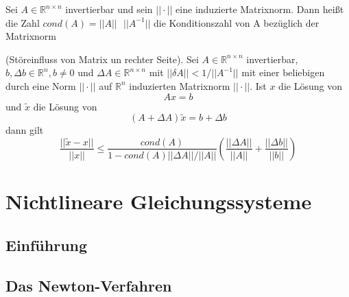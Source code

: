 \documentclass[
	ngerman,
	accentcolor=9c,%
	type=intern,
	marginpar=false
	]{tudapub}
\begin{document}
            \begin{definition}
                Sei $A \in \mathbb{R}^{n\times n}$ invertierbar und sein $|| \cdot||$ eine induzierte Matrixnorm. Dann heißt die Zahl $cond(A) = ||A||\mbox{ }||A^{-1}||$ die Konditionszahl von A bezüglich der Matrixnorm
            \end{definition}
            \begin{satz}
                (Störeinfluss von Matrix un rechter Seite). Sei $A \in \mathbb{R}^{n \times n}$ invertierbar, $b,\Delta b \in \mathbb{R}^n, b \not = 0$ und $\Delta A \in \mathbb{R}^{n \times n}$ mit $||\delta A|| < 1/ ||A^{-1}||$
                mit einer beliebigen durch eine Norm $||\cdot||$ auf $\mathbb{R}^n$ induzierten Matrixnorm $||\cdot||$.
                Ist $x$ die Lösung von
                \begin{equation*}
                    Ax = b
                \end{equation*}
                und $\tilde{x}$ die Lösung von 
                \begin{equation*}
                    (A+ \Delta A)\tilde{x} = b + \Delta b
                \end{equation*}
                dann gilt
                \begin{equation*}
                    \dfrac{||\tilde{x} - x||}{||x||} \leq \dfrac{cond(A)}{1-cond(A)||\Delta A|| / ||A||} \left(\dfrac{||\Delta A||}{||A||} + \dfrac{|| \Delta b||}{||b||}\right)
                \end{equation*}
            \end{satz}
    \section{Nichtlineare Gleichungssysteme}
            \subsection{Einführung}
            \subsection{Das Newton-Verfahren}
\end{document}
